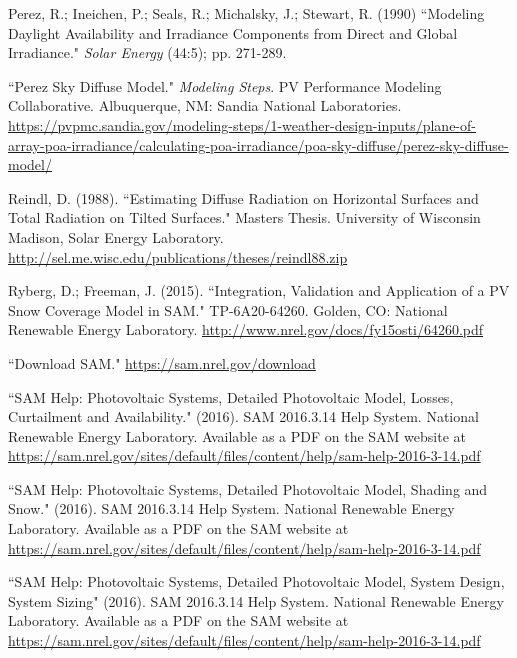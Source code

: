 \documentclass[12pt,letterpaper]{article}
\begin{document}
\begin{thebibliography}{99}
 Perez, R.; Ineichen, P.; Seals, R.; Michalsky, J.; Stewart, R. (1990) ``Modeling Daylight Availability and Irradiance Components from Direct and Global Irradiance." \textit{Solar Energy} (44:5); pp. 271-289.

 ``Perez Sky Diffuse Model."  \textit{Modeling Steps}. PV Performance Modeling Collaborative. Albuquerque, NM: Sandia National Laboratories.  \url{https://pvpmc.sandia.gov/modeling-steps/1-weather-design-inputs/plane-of-array-poa-irradiance/calculating-poa-irradiance/poa-sky-diffuse/perez-sky-diffuse-model/}

 Reindl, D. (1988). ``Estimating Diffuse Radiation on Horizontal Surfaces and Total Radiation on Tilted Surfaces." Masters Thesis. University of Wisconsin Madison, Solar Energy Laboratory. \url{http://sel.me.wisc.edu/publications/theses/reindl88.zip}

 Ryberg, D.; Freeman, J. (2015). ``Integration, Validation and Application of a PV Snow Coverage Model in SAM." TP-6A20-64260. Golden, CO: National Renewable Energy Laboratory. \url{http://www.nrel.gov/docs/fy15osti/64260.pdf}

 ``Download SAM." \url{https://sam.nrel.gov/download} 

 ``SAM Help: Photovoltaic Systems, Detailed Photovoltaic Model, Losses, Curtailment and Availability." (2016). SAM 2016.3.14 Help System. National Renewable Energy Laboratory. Available as a PDF on the SAM website at \url{https://sam.nrel.gov/sites/default/files/content/help/sam-help-2016-3-14.pdf}

 ``SAM Help: Photovoltaic Systems, Detailed Photovoltaic Model, Shading and Snow." (2016). SAM 2016.3.14 Help System. National Renewable Energy Laboratory. Available as a PDF on the SAM website at \url{https://sam.nrel.gov/sites/default/files/content/help/sam-help-2016-3-14.pdf}

 ``SAM Help: Photovoltaic Systems, Detailed Photovoltaic Model, System Design, System Sizing" (2016). SAM 2016.3.14 Help System. National Renewable Energy Laboratory. Available as a PDF on the SAM website at \url{https://sam.nrel.gov/sites/default/files/content/help/sam-help-2016-3-14.pdf}


\end{thebibliography}
\end{document}

